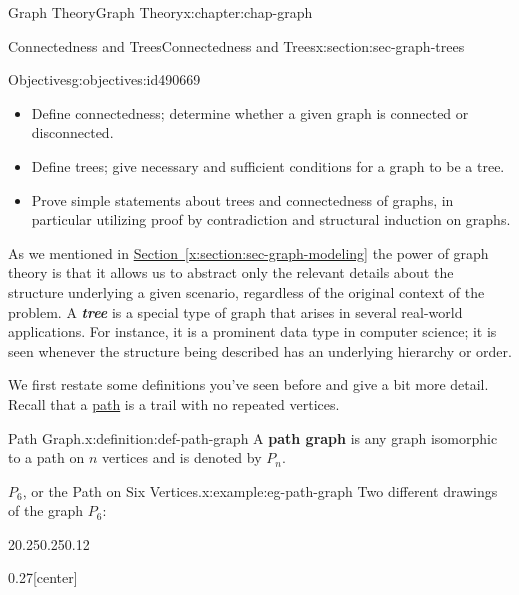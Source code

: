 \documentclass[oneside,10pt,]{book}
\newcommand{\xreffont}{\relax}
\newcommand{\alert}[1]{\textbf{\textit{#1}}}
\newcommand{\terminology}[1]{\textbf{#1}}
\numberwithin{equation}{section}
\begin{document}
\begin{chapterptx}{Graph Theory}{}{Graph Theory}{}{}{x:chapter:chap-graph}
%
%
\typeout{************************************************}
\typeout{************************************************}
%
\begin{sectionptx}{Connectedness and Trees}{}{Connectedness and Trees}{}{}{x:section:sec-graph-trees}
\begin{objectives}{Objectives}{g:objectives:id490669}
%
\begin{itemize}[label=\textbullet]
\item{}Define connectedness; determine whether a given graph is connected or disconnected.%
\item{}Define trees; give necessary and sufficient conditions for a graph to be a tree.%
\item{}Prove simple statements about trees and connectedness of graphs, in particular utilizing proof by contradiction and structural induction on graphs.%
\end{itemize}
\end{objectives}
As we mentioned in \hyperref[x:section:sec-graph-modeling]{Section~{\xreffont\ref{x:section:sec-graph-modeling}}} the power of graph theory is that it allows us to abstract only the relevant details about the structure underlying a given scenario, regardless of the original context of the problem. A \alert{tree} is a special type of graph that arises in several real-world applications. For instance, it is a prominent data type in computer science; it is seen whenever the structure being described has an underlying hierarchy or order.%
\par
We first restate some definitions you've seen before and give a bit more detail. Recall that a \hyperref[x:definition:def-path]{path} is a trail with no repeated vertices.%
\begin{definition}{Path Graph.}{x:definition:def-path-graph}%
A \terminology{path graph} is any graph isomorphic to a path on \(n\) vertices and is denoted by \(P_n\). \label{g:notation:id490705}%
\end{definition}
\begin{example}{\(P_6\), or the Path on Six Vertices.}{x:example:eg-path-graph}%
Two different drawings of the graph \(P_6\):%
\begin{sidebyside}{2}{0.25}{0.25}{0.12}%
\begin{sbspanel}{0.27}[center]%
\end{sbspanel}
\end{sidebyside}
\end{example}
\end{sectionptx}
\end{chapterptx}
\end{document}

